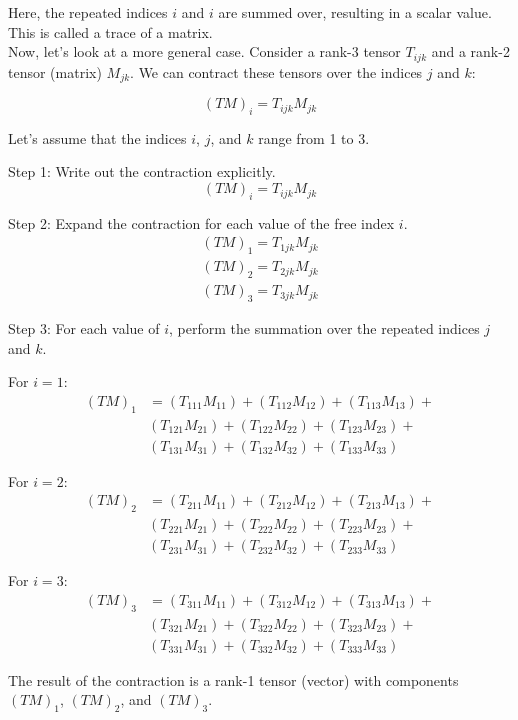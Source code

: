 Here, the repeated indices $i$ and $i$ are summed over, resulting in a scalar value.
This is called a trace of a matrix.
\\

Now, let's look at a more general case.
Consider a rank-3 tensor $T_{ijk}$ and a rank-2 tensor (matrix) $M_{jk}$.
We can contract these tensors over the indices $j$ and $k$:

$$
(TM)_i = T_{ijk} M_{jk}
$$

Let's assume that the indices $i$, $j$, and $k$ range from 1 to 3.

Step 1: Write out the contraction explicitly.
$$
(TM)_i = T_{ijk} M_{jk}
$$

Step 2: Expand the contraction for each value of the free index $i$.
\begin{align*}
(TM)_1 = T_{1jk} M_{jk} \\
(TM)_2 = T_{2jk} M_{jk} \\
(TM)_3 = T_{3jk} M_{jk}
\end{align*}

Step 3: For each value of $i$, perform the summation over the repeated indices $j$ and $k$.

For $i = 1$:
\begin{align*}
(TM)_1 &= (T_{111} M_{11}) + (T_{112} M_{12}) + (T_{113} M_{13}) + \\
        & (T_{121} M_{21}) + (T_{122} M_{22}) + (T_{123} M_{23}) + \\
        & (T_{131} M_{31}) + (T_{132} M_{32}) + (T_{133} M_{33})
\end{align*}


For $i = 2$:
\begin{align*}
(TM)_2 &= (T_{211} M_{11}) + (T_{212} M_{12}) + (T_{213} M_{13}) + \\
        & (T_{221} M_{21}) + (T_{222} M_{22}) + (T_{223} M_{23}) + \\
        & (T_{231} M_{31}) + (T_{232} M_{32}) + (T_{233} M_{33})
\end{align*}

For $i = 3$:
\begin{align*}
(TM)_3 &= (T_{311} M_{11}) + (T_{312} M_{12}) + (T_{313} M_{13}) + \\
        & (T_{321} M_{21}) + (T_{322} M_{22}) + (T_{323} M_{23}) + \\
        & (T_{331} M_{31}) + (T_{332} M_{32}) + (T_{333} M_{33})
\end{align*}

The result of the contraction is a rank-1 tensor (vector) with components $(TM)_1$, $(TM)_2$, and $(TM)_3$.

